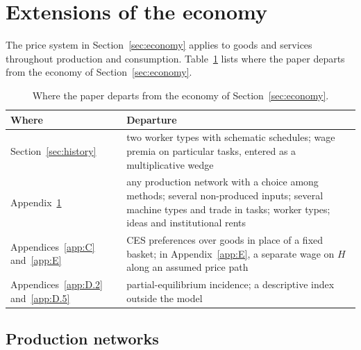 \documentclass[12pt]{article}
\theoremstyle{plain}
\theoremstyle{definition}
\theoremstyle{remark}
\begin{document}
\section{Extensions of the economy}\label{app:extensions}

The price system in Section~\ref{sec:economy} applies to goods and services throughout production and consumption.
Table~\ref{tab:departures} lists where the paper departs from the economy of Section~\ref{sec:economy}.

\begin{table}[htbp]
\centering
\caption{Where the paper departs from the economy of Section~\ref{sec:economy}.}
\label{tab:departures}
{\small
\begin{tabular}{@{}p{4.4cm} p{10.2cm}@{}}
\toprule
Where & Departure \\
\midrule
Section~\ref{sec:history} & two worker types with schematic schedules; wage premia on particular tasks, entered as a multiplicative wedge \\
Appendix~\ref{app:extensions} & any production network with a choice among methods; several non-produced inputs; several machine types and trade in tasks; worker types; ideas and institutional rents \\
Appendices~\ref{app:C} and~\ref{app:E} & CES preferences over goods in place of a fixed basket; in Appendix~\ref{app:E}, a separate wage on $H$ along an assumed price path \\
Appendices~\ref{app:D.2} and~\ref{app:D.5} & partial-equilibrium incidence; a descriptive index outside the model \\
\bottomrule
\end{tabular}
}
\end{table}

\subsection{Production networks}\label{app:networks}
\end{document}
